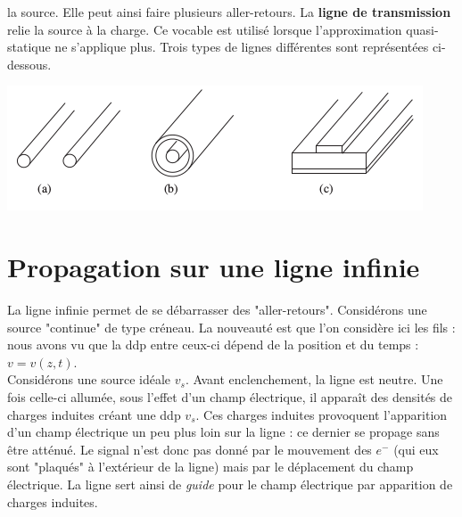 la source. Elle peut ainsi faire plusieurs aller-retours. La \textbf{ligne de transmission} relie 
la source à la charge. Ce vocable est utilisé lorsque l'approximation quasi-statique ne s'applique 
plus. Trois types de lignes différentes sont représentées ci-dessous.
\begin{center}
	\includegraphics[scale=0.45]{ch2/image2.png}
\end{center}

\section{Propagation sur une ligne infinie}
La ligne infinie permet de se débarrasser des "aller-retours". Considérons une source "continue" 
de type créneau. La nouveauté est que l'on considère ici les fils : nous avons vu que la ddp entre 
ceux-ci dépend de la position et du temps : $v=v(z,t)$.\\
Considérons une source idéale $v_s$. Avant enclenchement, la ligne est neutre. Une fois celle-ci 
allumée, sous l'effet d'un champ électrique, il apparaît des densités de charges induites 
créant une ddp $v_s$. Ces charges induites provoquent l'apparition d'un champ électrique un peu 
plus loin sur la ligne : ce dernier se propage sans être atténué. Le signal n'est donc pas donné 
par le mouvement des $e^-$ (qui eux sont "plaqués" à l'extérieur de la ligne) mais par le déplacement 
du champ électrique. La ligne sert ainsi de \textit{guide} pour le champ électrique par apparition 
de charges induites.\newpage


